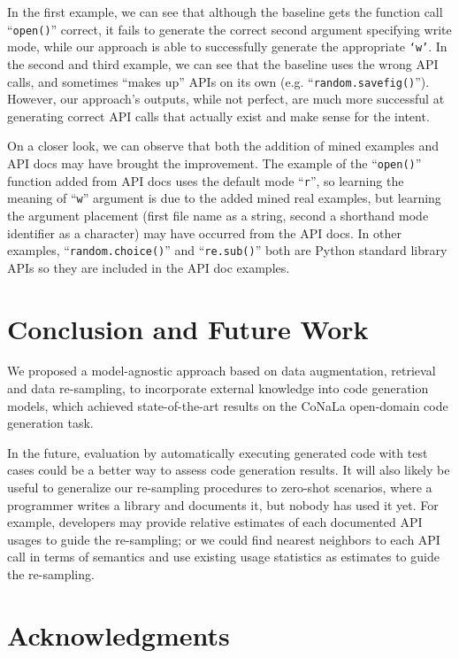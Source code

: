 \documentclass[11pt,a4paper]{article}
\begin{document}
In the first example, we can see that although the baseline gets the function call ``\texttt{open()}'' correct, it fails to generate the correct second argument specifying write mode, while our approach is able to successfully generate the appropriate \texttt{`w'}.
In the second and third example, we can see that the baseline uses the wrong API calls, and sometimes ``makes up'' APIs on its own (e.g. ``\texttt{random.savefig()}'').
However, our approach's outputs, while not perfect, are much more successful at generating correct API calls that actually exist and make sense for the intent.

On a closer look, we can observe that both the addition of mined examples and API docs may have brought the improvement.
The example of the ``\texttt{open()}'' function added from API docs uses the default mode ``\texttt{r}'', so learning the meaning of ``\texttt{w}'' argument is due to the added mined real examples, but learning the argument placement (first file name as a string, second a shorthand mode identifier as a character) may have occurred from the API docs. 
In other examples, ``\texttt{random.choice()}'' and ``\texttt{re.sub()}'' both are Python standard library APIs so they are included in the API doc examples.

\section{Conclusion and Future Work}
We proposed a model-agnostic approach based on data augmentation, retrieval and data re-sampling, to incorporate external knowledge into code generation models, which achieved state-of-the-art results on the CoNaLa open-domain code generation task.

In the future, evaluation by automatically executing generated code with test cases could be a better way to assess code generation results. 
It will also likely be useful to generalize our re-sampling procedures to zero-shot scenarios, where a programmer writes a library and documents it, but nobody has used it yet.
For example, developers may provide relative estimates of each documented API usages to guide the re-sampling; or we could find nearest neighbors to each API call in terms of semantics and use existing usage statistics as estimates to guide the re-sampling. 

\section*{Acknowledgments}
\end{document}
